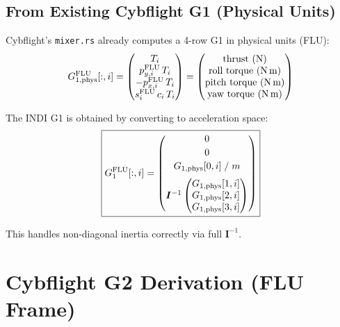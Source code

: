 \documentclass[11pt]{article}
\newcommand{\flu}{\mathrm{FLU}}
\begin{document}
\subsection{From Existing Cybflight G1 (Physical Units)}

Cybflight's \texttt{mixer.rs} already computes a 4-row G1 in physical units (FLU):
\begin{equation}
    G_{1,\mathrm{phys}}^{\flu}[:,i] = \begin{pmatrix}
        T_i \\
        p_{y,i}^{\flu} \, T_i \\
        -p_{x,i}^{\flu} \, T_i \\
        s_i^{\flu} \, c_i \, T_i
    \end{pmatrix}
    = \begin{pmatrix}
        \text{thrust (N)} \\
        \text{roll torque (N\,m)} \\
        \text{pitch torque (N\,m)} \\
        \text{yaw torque (N\,m)}
    \end{pmatrix}
\end{equation}

The INDI G1 is obtained by converting to acceleration space:
\begin{equation}\label{eq:g1_from_phys}
    \boxed{
    G_1^{\flu}[:,i] = \begin{pmatrix}
        0 \\[2pt]
        0 \\[2pt]
        G_{1,\mathrm{phys}}[0,i] \;/\; m \\[6pt]
        \multicolumn{1}{c}{\bm{I}^{-1} \begin{pmatrix}
            G_{1,\mathrm{phys}}[1,i] \\
            G_{1,\mathrm{phys}}[2,i] \\
            G_{1,\mathrm{phys}}[3,i]
        \end{pmatrix}}
    \end{pmatrix}
    }
\end{equation}

This handles non-diagonal inertia correctly via full $\bm{I}^{-1}$.

\section{Cybflight G2 Derivation (FLU Frame)}
\end{document}
